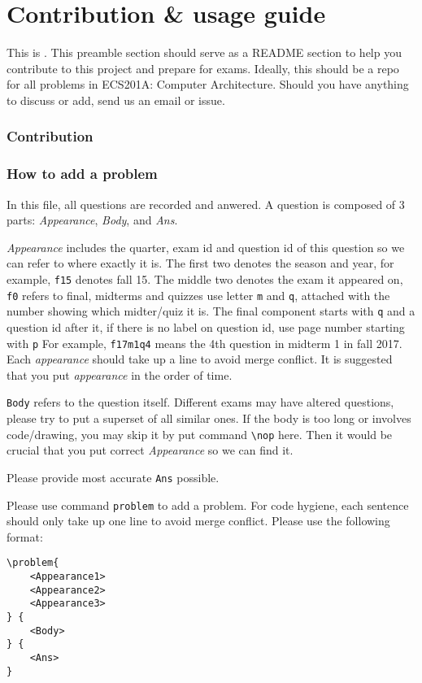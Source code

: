 \section*{Contribution \& usage guide}
This is \name. 
This preamble section should serve as a README section to help you contribute to this project and prepare for exams.
Ideally, this should be a repo for all problems in ECS201A: Computer Architecture.
Should you have anything to discuss or add, send us an email or issue.

\subsubsection*{Contribution}

\subsubsection*{How to add a problem}
In this file, all questions are recorded and anwered.
A question is composed of 3 parts: \textit{Appearance}, \textit{Body}, and \textit{Ans}.

\textit{Appearance} includes the quarter, exam id and question id of this question so we can refer to where exactly it is.
The first two denotes the season and year, for example, \texttt{f15} denotes fall 15.
The middle two denotes the exam it appeared on, \texttt{f0} refers to final, midterms and quizzes use letter \texttt{m} and \texttt{q}, attached with the number showing which midter/quiz it is.
The final component starts with \texttt{q} and a question id after it, if there is no label on question id, use page number starting with \texttt{p}
For example, \texttt{f17m1q4} means the 4th question in midterm 1 in fall 2017.
Each \textit{appearance} should take up a line to avoid merge conflict. 
It is suggested that you put \textit{appearance} in the order of time.

\texttt{Body} refers to the question itself. 
Different exams may have altered questions, please try to put a superset of all similar ones.
If the body is too long or involves code/drawing, you may skip it by put command \lstinline{\nop} here.
Then it would be crucial that you put correct \textit{Appearance} so we can find it.

Please provide most accurate \texttt{Ans} possible.

Please use command \texttt{problem} to add a problem.
For code hygiene, each sentence should only take up one line to avoid merge conflict.
Please use the following format:
\begin{lstlisting}
\problem{
    <Appearance1>
    <Appearance2>
    <Appearance3>
} {
    <Body>
} {
    <Ans>
}
\end{lstlisting}

